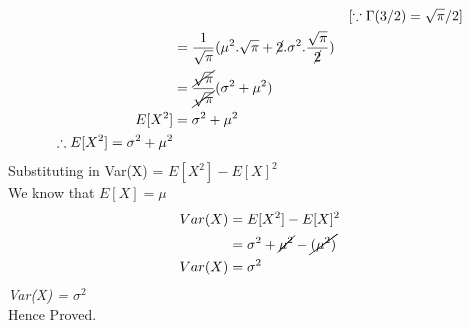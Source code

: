 \begin{Solution}
\begin{align*}
        &&[\because \Gamma(3/2) = \sqrt{\pi}/2] \\
        &= \frac{1}{\sqrt{\pi}} (\mu^2.\sqrt{\pi} + \cancel{2}.\sigma^2.\frac{\sqrt{\pi}}{\cancel{2}})\\
        &= \frac{\cancel{\sqrt{\pi}}}{\cancel{\sqrt{\pi}}}(\sigma^2 + \mu^2)\\
        E[X^2] &= \sigma^2 + \mu^2\\
        \therefore E[X^2] = \sigma^2 + \mu^2
    \end{align*}
    Substituting in Var(X) = $E[X^2] - E[X]^2 $ \\We know that $E[X] = \mu$
    \begin{align*}
        Var(X) &= E[X^2] - E[X]^2\\
        &= \sigma^2 + \cancel{\mu^2} - \cancel{(\mu^2)}\\
        Var(X) &= \sigma^2
    \end{align*}
    \therefore \textit{Var(X) = $\sigma^2$}\\
        Hence Proved.\\\\
    \end{Solution}
    
    